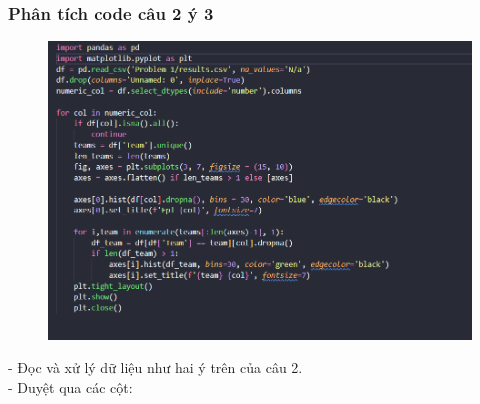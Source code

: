 \subsubsection{Phân tích code câu 2 ý 3}
    \begin{figure}[H]
        \centering
        \includegraphics[width=1\linewidth]{img/2_3.png}
    \end{figure}
    - Đọc và xử lý dữ liệu như hai ý trên của câu 2.\\
    - Duyệt qua các cột:
